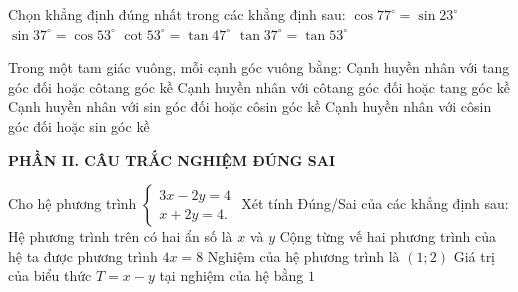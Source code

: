 \documentclass[12pt,a4paper]{article}
\begin{document}
\begin{ex}
Chọn khẳng định đúng nhất trong các khẳng định sau:
\choice
{$\cos 77^\circ = \sin 23^\circ$}
{\True $\sin 37^\circ = \cos 53^\circ$}
{$\cot 53^\circ = \tan 47^\circ$}
{$\tan 37^\circ = \tan 53^\circ$}
\end{ex}

\begin{ex}
Trong một tam giác vuông, mỗi cạnh góc vuông bằng:
\choice
{Cạnh huyền nhân với tang góc đối hoặc côtang góc kề}
{Cạnh huyền nhân với côtang góc đối hoặc tang góc kề}
{\True Cạnh huyền nhân với sin góc đối hoặc côsin góc kề}
{Cạnh huyền nhân với côsin góc đối hoặc sin góc kề}
\end{ex}


\setcounter{ex}{0}
\noindent\textbf{\large PHẦN II. CÂU TRẮC NGHIỆM ĐÚNG SAI}
\vspace{1mm}
\begin{ex}
Cho hệ phương trình $\begin{cases} 3x - 2y = 4 \\ x + 2y = 4. \end{cases}$ Xét tính Đúng/Sai của các khẳng định sau:
\choiceTF
{\True Hệ phương trình trên có hai ẩn số là $x$ và $y$}
{\True Cộng từng vế hai phương trình của hệ ta được phương trình $4x = 8$}
{Nghiệm của hệ phương trình là $(1; 2)$}
{\True Giá trị của biểu thức $T = x - y$ tại nghiệm của hệ bằng $1$}
\end{ex}
\end{document}
